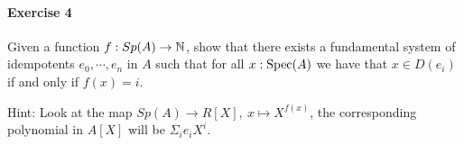\paragraph{Exercise 4}{
  Given a function $f:Sp(A)\to \mathbb{N}$, show that there exists a fundamental system of idempotents $e_0,\cdots,e_n$ in $A$ such that for all $x:\operatorname{Spec}(A)$ we have that $x\in D(e_i)$ if and only if $f(x)= i$. 
 }
 
 Hint: Look at the map $Sp(A)\rightarrow R[X],~x\mapsto X^{f(x)}$, the corresponding polynomial in $A[X]$ will be $\Sigma_i e_iX^i$.